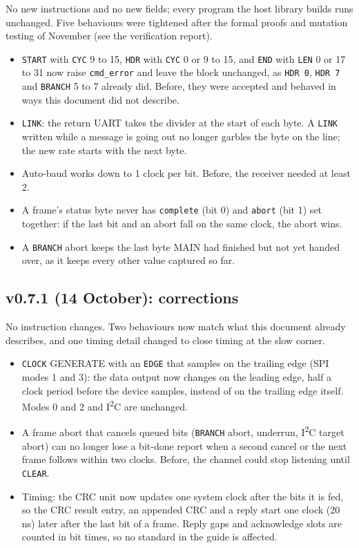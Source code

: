 \documentclass[11pt,a4paper]{article}
\newcommand{\sig}[1]{\texttt{#1}}
\begin{document}
No new instructions and no new fields; every program the host library builds runs unchanged. Five behaviours were tightened after the formal proofs and mutation testing of November (see the verification report).
\begin{itemize}
\item \sig{START} with \sig{CYC} 9 to 15, \sig{HDR} with \sig{CYC} 0 or 9 to 15, and \sig{END} with \sig{LEN} 0 or 17 to 31 now raise \sig{cmd\_error} and leave the block unchanged, as \sig{HDR 0}, \sig{HDR 7} and \sig{BRANCH} 5 to 7 already did. Before, they were accepted and behaved in ways this document did not describe.
\item \sig{LINK}: the return UART takes the divider at the start of each byte. A \sig{LINK} written while a message is going out no longer garbles the byte on the line; the new rate starts with the next byte.
\item Auto-baud works down to 1 clock per bit. Before, the receiver needed at least 2.
\item A frame's status byte never has \sig{complete} (bit 0) and \sig{abort} (bit 1) set together: if the last bit and an abort fall on the same clock, the abort wins.
\item A \sig{BRANCH} abort keeps the last byte MAIN had finished but not yet handed over, as it keeps every other value captured so far.
\end{itemize}

\subsection{v0.7.1 (14 October): corrections}

No instruction changes. Two behaviours now match what this document already describes, and one timing detail changed to close timing at the slow corner.
\begin{itemize}
\item \sig{CLOCK} GENERATE with an \sig{EDGE} that samples on the trailing edge (SPI modes 1 and 3): the data output now changes on the leading edge, half a clock period before the device samples, instead of on the trailing edge itself. Modes 0 and 2 and I\textsuperscript{2}C are unchanged.
\item A frame abort that cancels queued bits (\sig{BRANCH} abort, underrun, I\textsuperscript{2}C target abort) can no longer lose a bit-done report when a second cancel or the next frame follows within two clocks. Before, the channel could stop listening until \sig{CLEAR}.
\item Timing: the CRC unit now updates one system clock after the bits it is fed, so the CRC result entry, an appended CRC and a reply start one clock (20\,ns) later after the last bit of a frame. Reply gaps and acknowledge slots are counted in bit times, so no standard in the guide is affected.
\end{itemize}
\end{document}
